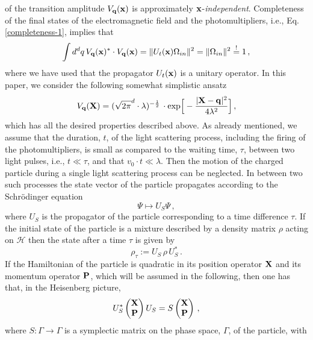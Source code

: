 \documentclass[11pt]{article}
\begin{document}
of the transition amplitude $V_{\bf{q}}({\bf{x}})$ is approximately ${\bf{x}}$-\textit{independent}. Completeness of the final states of the electromagnetic field and the photomultipliers, i.e., Eq. \eqref{completeness-1}, implies that
\begin{equation}\label{completeness-2}
\int d^{d}q\, V_{\bf{q}} ({\bf{x}})^{*}\cdot V_{\bf{q}} ({\bf{x}}) = \Vert U_{t}({\bf{x}}) \Omega_{in} \Vert^{2} 
= \Vert \Omega_{in} \Vert^{2}\overset{!}{=} 1\,,
\end{equation}
where we have used that the propagator $U_{t}({\bf{x}})$ is a unitary operator. In this paper, we consider the following somewhat simplistic ansatz 
\begin{equation}\label{Gauss}
V_{{\bf{q}}} ({\bf{X}})= (\sqrt{2\pi}^{d}\cdot \lambda)^{-\frac{1}{2}}\, \cdot\text{exp}\Big[-\frac{\vert {\bf{X}}-{\bf{q}} \vert^{2}}{4\lambda^{2}}\Big]\,,
\end{equation}
which has all the desired properties described above.
As already mentioned, we assume that the duration, $t$, of the light scattering process, including the firing of the 
photomultipliers, is small as compared to the waiting time, $\tau$, between two light pulses, i.e., $t\ll \tau$, and that 
$v_0 \cdot t \ll \lambda$. Then the motion of the charged particle during a single light scattering process can be neglected.
In between two such processes the state vector of the particle propagates according to the Schr\"odinger equation 
$$\Psi \mapsto U_{S} \Psi\,,$$
where $U_{S}$ is the propagator of the particle corresponding to a time difference $\tau$. If the initial state of the particle is a mixture described by a density matrix $\rho$ acting on $\mathcal{H}$ then the state after a time $\tau$ is given by 
$$\rho_{\tau}:= U_{S}\, \rho\, U_{S}^{*}\,.$$
If the Hamiltonian of the particle is quadratic in its position operator ${\bf{X}}$ and its momentum operator ${\bf{P}}$, 
which will be assumed in the following, then one has that, in the Heisenberg picture,
\begin{equation}\label{evol}
U_{S}^{*} \begin{pmatrix}{\bf{X}}\\{\bf{P}}\end{pmatrix} U_{S}=S \begin{pmatrix} {\bf{X}}\\ {\bf{P}} \end{pmatrix}\,,
\end{equation}
where $S: \Gamma \rightarrow \Gamma$ is a symplectic matrix on the phase space, $\Gamma$, of the particle, with 
\end{document}
